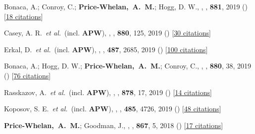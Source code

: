\item[{\color{deemph}\scriptsize53}]Bonaca, A.; Conroy, C.; \textbf{Price-Whelan,~A.~M.}; Hogg, D. W., , \apj, \textbf{881}, 2019 () [\href{http://adsabs.harvard.edu/abs/2019ApJ...881L..37B}{18 citations}]

\item[{\color{deemph}\scriptsize52}]Casey, A. R.~\textit{et al.}~(incl. \textbf{APW}), , \apj, \textbf{880}, 125, 2019 () [\href{http://adsabs.harvard.edu/abs/2019ApJ...880..125C}{30 citations}]

\item[{\color{deemph}\scriptsize51}]Erkal, D.~\textit{et al.}~(incl. \textbf{APW}), , \mnras, \textbf{487}, 2685, 2019 () [\href{http://adsabs.harvard.edu/abs/2019MNRAS.487.2685E}{100 citations}]

\item[{\color{deemph}\scriptsize50}]Bonaca, A.; Hogg, D. W.; \textbf{Price-Whelan,~A.~M.}; Conroy, C., , \apj, \textbf{880}, 38, 2019 () [\href{http://adsabs.harvard.edu/abs/2019ApJ...880...38B}{76 citations}]

\item[{\color{deemph}\scriptsize49}]Rasskazov, A.~\textit{et al.}~(incl. \textbf{APW}), , \apj, \textbf{878}, 17, 2019 () [\href{http://adsabs.harvard.edu/abs/2019ApJ...878...17R}{14 citations}]

\item[{\color{deemph}\scriptsize48}]Koposov, S. E.~\textit{et al.}~(incl. \textbf{APW}), , \mnras, \textbf{485}, 4726, 2019 () [\href{http://adsabs.harvard.edu/abs/2019MNRAS.485.4726K}{48 citations}]

\item[{\color{deemph}\scriptsize47}]\textbf{Price-Whelan,~A.~M.}; Goodman, J., , \apj, \textbf{867}, 5, 2018 () [\href{http://adsabs.harvard.edu/abs/2018ApJ...867....5P}{17 citations}]

